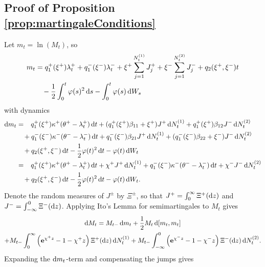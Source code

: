 \documentclass[11pt,a4paper]{article}
\numberwithin{equation}{section}
\theoremstyle{remark}
\theoremstyle{definition}
\newcommand{\e}{{\bf e}}
\newcommand{\dd}{{\rm d}}
\begin{document}
\subsection{Proof of Proposition \ref{prop:martingaleConditions}}\label{proof:prop:martingaleConditions}
Let $m_t=\ln(M_t)$, so
\begin{align*}
     m_t &= q_1^+(\xi^+) \lambda_t^+ + q_1^-(\xi^-) \lambda_t^-
      + \xi^+ \sum_{j=1}^{N_t^{(1)}} J_j^+ + \xi^- \sum_{j=1}^{N_t^{(2)}} J_j^- +
        q_2(\xi^+, \xi^-) t  \\%
      &\phantom{=\,}-\frac{1}{2} \int_0^t\varphi(s)^2\,
                                \dd s - \int_0^t \varphi(s)\, \dd  W_s
\end{align*}
with dynamics
\begin{align*}
    \dd m_t &= \phantom{=} q_1^+(\xi^+) \kappa^+ (\theta^+ - \lambda_t^+)\, \dd
            t + (q_1^+(\xi^+)
            \beta_{11} + \xi^+) J^+\, \dd N_t^{(1)} + q_1^+(\xi^+)
            \beta_{12} J^-\, \dd N_t^{(2)}\\ %
    &\phantom{=\,} +  q_1^-(\xi^-) \kappa^- (\theta^- - \lambda_t^-)\, \dd
            t + q_1^-(\xi^-)
            \beta_{21} J^+\, \dd N_t^{(1)} + (q_1^-(\xi^-)
            \beta_{22} + \xi^-) J^-\, \dd N_t^{(2)} \\%
    & \phantom{=\,} + q_2(\xi^+,\xi^-)\, \dd t -
    \frac{1}{2}\varphi(t)^2\, \dd t - \varphi(t)\, \dd W_t\\
    &= \phantom{=} q_1^+(\xi^+) \kappa^+ (\theta^+ - \lambda_t^+)\, \dd
     t + \chi^+ J^+\, \dd N_t^{(1)}  %
    +  q_1^-(\xi^-) \kappa^- (\theta^- - \lambda_t^-)\, \dd
    t + \chi^- J^-\, \dd N_t^{(2)} \\%
    & \phantom{=\,} + q_2(\xi^+,\xi^-)\, \dd t - \frac{1}{2}\varphi(t)^2\, \dd t - \varphi(t)\, \dd W_t.
\end{align*}
    Denote the random measures of $J^\pm$ by $\Xi^\pm$, so that $J^+=\int_0^\infty \Xi^+(\dd z)$ and $J^-=\int_{-\infty}^0 \Xi^-(\dd z)$. Applying Ito's Lemma for semimartingales \citep[e.g.\ Section 8.10 of][]{Klebaner2005} to $M_t$ gives
\begin{multline*}
    \dd M_t = M_{t-}\, \dd m_t + \frac{1}{2} M_t \, \dd[m_t, m_t] \\%
    + M_{t-} \int_0^\infty
            \left(\e^{\chi^+ z} - 1 - \chi^+ z\right) \Xi^+(\dd z)\, \dd
            N_t^{(1)} %
    + M_{t-} \int_{-\infty}^0
            \left(\e^{\chi^- z} - 1 - \chi^- z\right) \Xi^-(\dd z)\, \dd N_t^{(2)}.
\end{multline*}
Expanding the $\dd m_t$-term and compensating the jumps gives
\end{document}
